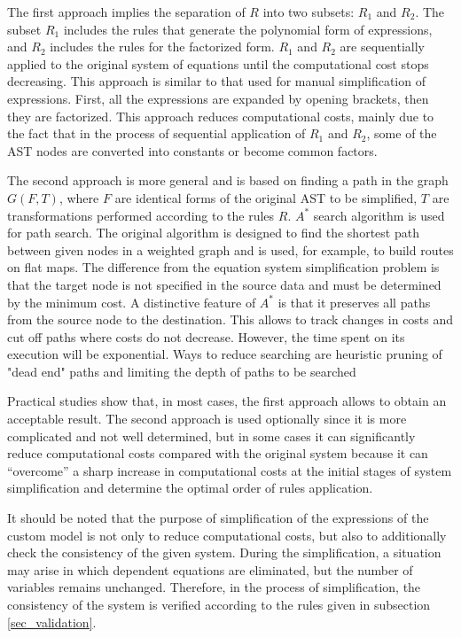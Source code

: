 \documentclass[lettersize,journal]{IEEEtran}
\begin{document}
The first approach implies the separation of \(R\) into two subsets: \(R_1\) and \(R_2\). The subset \(R_1\) includes the rules that generate the 
polynomial form of expressions, and \(R_2\) includes the rules for the factorized form. \(R_1\) and \(R_2\) are sequentially applied to the original 
system of equations until the computational cost stops decreasing. This approach is similar to that used for manual simplification of expressions. 
First, all the expressions are expanded by opening brackets, then they are factorized. This approach reduces computational costs, mainly due to 
the fact that in the process of sequential application of \(R_1\) and \(R_2\), some of the AST nodes are converted into constants or become common factors.

The second approach is more general and is based on finding a path in the graph \(G(F,T)\), where \(F\) are identical forms of the original AST to be simplified,
\(T\) are transformations performed according to the rules \(R\). \(A^*\) search algorithm \cite{pearl84} is used for path search. The original
algorithm is designed to find the shortest path between given nodes in a weighted graph and is used, for example, to build routes on flat maps. 
The difference from the equation system simplification problem is that the target node is not specified in the source data and must be determined 
by the minimum cost. A distinctive feature of \(A^*\) is that it preserves all paths from the source node to the destination. This allows to track
changes in costs and cut off paths where costs do not decrease. However, the time spent on its execution will be exponential. Ways to reduce
searching are heuristic pruning of "dead end" paths and limiting the depth of paths to be searched

Practical studies show that, in most cases, the first approach allows to obtain an acceptable result. The second approach is used optionally
since it is more complicated and not well determined, but in some cases it can significantly reduce computational costs compared with the original 
system because it can “overcome” a sharp increase in computational costs at the initial stages of system simplification and determine 
the optimal order of rules application.

It should be noted that the purpose of simplification of the expressions of the custom model is not only to reduce computational costs, but also to
additionally check the consistency of the given system. During the simplification, a situation may arise in which dependent equations are
eliminated, but the number of variables remains unchanged. Therefore, in the process of simplification, the consistency of the system is verified
according to the rules given in subsection \ref{sec_validation}.
\end{document}

